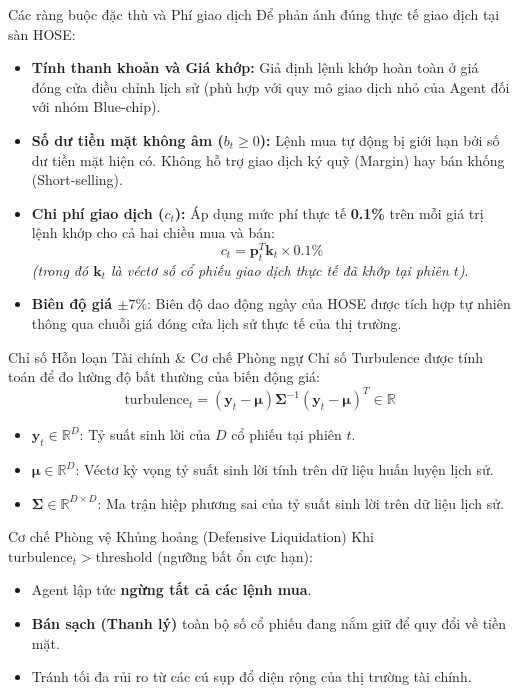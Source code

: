 \documentclass[10pt,aspectratio=169]{beamer}
\begin{document}
\begin{frame}{Các ràng buộc đặc thù và Phí giao dịch}
  Để phản ánh đúng thực tế giao dịch tại sàn HOSE:
  \begin{itemize}
    \item[\color{secondary}\textbf{1.}] \textbf{Tính thanh khoản và Giá khớp:} Giả định lệnh khớp hoàn toàn ở giá đóng cửa điều chỉnh lịch sử (phù hợp với quy mô giao dịch nhỏ của Agent đối với nhóm Blue-chip).
    \item[\color{secondary}\textbf{2.}] \textbf{Số dư tiền mặt không âm ($b_t \geq 0$):} Lệnh mua tự động bị giới hạn bởi số dư tiền mặt hiện có. Không hỗ trợ giao dịch ký quỹ (Margin) hay bán khống (Short-selling).
    \item[\color{secondary}\textbf{3.}] \textbf{Chi phí giao dịch ($c_t$):} Áp dụng mức phí thực tế \textbf{0.1\%} trên mỗi giá trị lệnh khớp cho cả hai chiều mua và bán:
    $$c_t = \mathbf{p}_t^T \mathbf{k}_t \times 0.1\%$$
    \textit{(trong đó $\mathbf{k}_t$ là véctơ số cổ phiếu giao dịch thực tế đã khớp tại phiên $t$)}.
    \item[\color{secondary}\textbf{4.}] \textbf{Biên độ giá $\pm 7\%$}: Biên độ dao động ngày của HOSE được tích hợp tự nhiên thông qua chuỗi giá đóng cửa lịch sử thực tế của thị trường.
  \end{itemize}
\end{frame}

\begin{frame}{Chỉ số Hỗn loạn Tài chính \& Cơ chế Phòng ngự}
  Chỉ số Turbulence được tính toán để đo lường độ bất thường của biến động giá:
  $$\text{turbulence}_t = (\mathbf{y}_t - \boldsymbol{\mu}) \boldsymbol{\Sigma}^{-1} (\mathbf{y}_t - \boldsymbol{\mu})^T \in \mathbb{R}$$
  \begin{itemize}
    \item $\mathbf{y}_t \in \mathbb{R}^D$: Tỷ suất sinh lời của $D$ cổ phiếu tại phiên $t$.
    \item $\boldsymbol{\mu} \in \mathbb{R}^D$: Véctơ kỳ vọng tỷ suất sinh lời tính trên dữ liệu huấn luyện lịch sử.
    \item $\boldsymbol{\Sigma} \in \mathbb{R}^{D \times D}$: Ma trận hiệp phương sai của tỷ suất sinh lời trên dữ liệu lịch sử.
  \end{itemize}
  
  \begin{alertblock}{Cơ chế Phòng vệ Khủng hoảng (Defensive Liquidation)}
    Khi $\text{turbulence}_t > \text{threshold}$ (ngưỡng bất ổn cực hạn):
    \begin{itemize}
      \item Agent lập tức \textbf{ngừng tất cả các lệnh mua}.
      \item \textbf{Bán sạch (Thanh lý)} toàn bộ số cổ phiếu đang nắm giữ để quy đổi về tiền mặt.
      \item Tránh tối đa rủi ro từ các cú sụp đổ diện rộng của thị trường tài chính.
    \end{itemize}
  \end{alertblock}
\end{frame}
\end{document}
